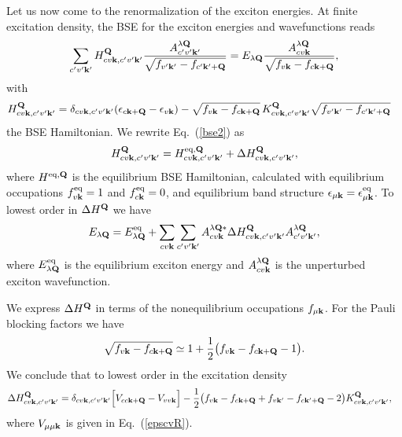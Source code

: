 \documentclass[twocolumn,aps,a4paper,superscriptaddress]{revtex4-2}
\begin{document}
\begin{widetext}
Let us now come to the renormalization of the exciton energies.
At finite excitation density, the BSE for the
exciton energies and wavefunctions reads
\begin{align}
\sum_{c'v'{\mathbf k}'}H^{{\mathbf Q}}_{cv{\mathbf k},c'v'{\mathbf k}'}
\frac{A^{\lambda{\mathbf Q}}_{c'v'{\mathbf k}'}}
{\sqrt{f_{v'{\mathbf k}'}-f_{c'{\mathbf k}'+{\mathbf Q}}}}=
E_{\lambda{\mathbf Q}}\frac{A^{\lambda{\mathbf Q}}_{cv{\mathbf k}}}{\sqrt{f_{v{\mathbf k}}-f_{c{\mathbf k}+{\mathbf Q}}}},
\label{bse1}
\end{align}
with
\begin{align}
H^{{\mathbf Q}}_{cv{\mathbf k},c'v'{\mathbf k}'}&=\delta_{cv{\mathbf k},c'v'{\mathbf k}'}
(\epsilon_{c{\mathbf k}+{\mathbf Q}}-\epsilon_{v{\mathbf k}})
-\sqrt{f_{v{\mathbf k}}-f_{c{\mathbf k}+{\mathbf Q}}}\,K^{{\mathbf Q}}_{cv{\mathbf k},c'v'{\mathbf k}'}
\sqrt{f_{v'{\mathbf k}'}-f_{c'{\mathbf k}'+{\mathbf Q}}}
\label{bse2}
\end{align}
the BSE Hamiltonian.
We rewrite Eq.~(\ref{bse2}) as
\begin{align}
H^{{\mathbf Q}}_{cv{\mathbf k},c'v'{\mathbf k}'}=H^{{\rm eq},{\mathbf Q}}_{cv{\mathbf k},c'v'{\mathbf k}'}+\Delta
H^{{\mathbf Q}}_{cv{\mathbf k},c'v'{\mathbf k}'},
\end{align}
where $H^{{\rm eq},{\mathbf Q}}$ is the equilibrium BSE Hamiltonian,
calculated with equilibrium occupations $f^{\rm eq}_{v{\mathbf k}}=1$ and
$f^{\rm eq}_{c{\mathbf k}}=0$, and
equilibrium band structure $\epsilon_{\mu{\mathbf k}}=\epsilon^{\rm eq}_{\mu{\mathbf k}}$.
To lowest order in $\Delta H^{{\mathbf Q}}$ we have
\begin{align}
E_{\lambda{\mathbf Q}}=E^{\rm eq}_{\lambda{\mathbf Q}}+\sum_{cv{\mathbf k}}\sum_{c'v'{\mathbf k}'}
A^{\lambda{\mathbf Q}\ast}_{cv{\mathbf k}}\Delta
H^{{\mathbf Q}}_{cv{\mathbf k},c'v'{\mathbf k}'}A^{\lambda{\mathbf Q}}_{c'v'{\mathbf k}'},
\label{rxene}
\end{align}
where $E^{\rm eq}_{\lambda{\mathbf Q}}$ is the equilibrium exciton energy and
$A^{\lambda{\mathbf Q}}_{cv{\mathbf k}}$ is the unperturbed exciton wavefunction.

We express $\Delta H^{{\mathbf Q}}$ in terms of the nonequilibrium occupations
$f_{\mu{\mathbf k}}$.
For the Pauli blocking factors we have
\begin{align}
\sqrt{f_{v{\mathbf k}}-f_{c{\mathbf k}+{\mathbf Q}}}
\simeq
1+\frac{1}{2}\big(f_{v{\mathbf k}}-f_{c{\mathbf k}+{\mathbf Q}}-1\big).
\end{align}
We conclude that to lowest order in the excitation density
\begin{align}
\Delta H^{{\mathbf Q}}_{cv{\mathbf k},c'v'{\mathbf k}'}&=
\delta_{cv{\mathbf k},c'v'{\mathbf k}'}\Big[V_{cc{\mathbf k}+{\mathbf Q}}-V_{vv{\mathbf k}}\Big]
-\frac{1}{2}\big(f_{v{\mathbf k}}-f_{c{\mathbf k}+{\mathbf Q}}+
f_{v{\mathbf k}'}-f_{c{\mathbf k}'+{\mathbf Q}}-2\big)
K^{{\mathbf Q}}_{cv{\mathbf k},c'v'{\mathbf k}'},
\label{deltabse}
\end{align}
where $V_{\mu\mu{\mathbf k}}$ is given in Eq.~(\ref{epscvR}).


\end{widetext}
\end{document}
